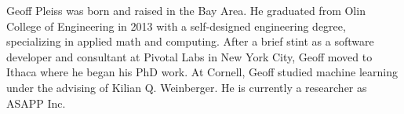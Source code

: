 Geoff Pleiss was born and raised in the Bay Area.
He graduated from Olin College of Engineering in 2013 with a self-designed engineering degree, specializing in applied math and computing.
After a brief stint as a software developer and consultant at Pivotal Labs in New York City, Geoff moved to Ithaca where he began his PhD work.
At Cornell, Geoff studied machine learning under the advising of Kilian Q. Weinberger.
He is currently a researcher as ASAPP Inc.

